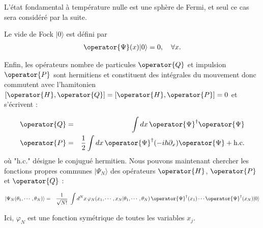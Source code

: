 
L’état fondamental à température nulle est une sphère de Fermi, et seul ce cas sera considéré par la suite.

Le vide de Fock \( |0\rangle \) est défini par %
\begin{eqnarray}
\operator{\Psi}(x) |0\rangle = 0, \quad \forall x. \label{eq:fock_vide}
\end{eqnarray}





Enfin, les opérateurs nombre de particules \( \operator{Q} \) et impulsion \( \operator{P} \) sont hermitiens et constituent des intégrales du mouvement donc commutent avec l'hamitonien $[\operator{H} , \operator{Q} ] = [\operator{H} , \operator{P}]  = 0 $ et s’écrivent :

\begin{eqnarray}
	\operator{Q}  &= & \int dx \, \operator{\Psi}^\dagger \operator{\Psi}  \label{eq:op_nombre} \\
	\operator{P}  &=& \frac{1}{2} \int dx \, \operator{\Psi}^\dagger (-i \hbar \partial_x) \operator{\Psi	} + \text{h.c.}  \label{eq:op_impulsion}
\end{eqnarray}
où "h.c." désigne le conjugué hermitien.
Nous pouvons maintenant chercher les fonctions propres communes \( |\Psi_N\rangle \) des opérateurs \( \operator{H} \), \( \operator{P} \) et \( \operator{Q} \) :

\begin{eqnarray*}
	|\Psi_N ( \theta_1 , \cdots , \theta_N ) \rangle  & = &  \frac{1}{\sqrt{N!}} \int d^N x \, \varphi_N ( x_1 , \cdots , x_N \vert \theta_1 , \cdots , \theta_N ) \, \operator{\Psi}^\dag ( x_1 ) \cdots \operator{\Psi}^\dag ( x_N  ) \vert 0 \rangle \label{eq:etat_bose}		
\end{eqnarray*}

Ici, \( \varphi_N \) est une fonction symétrique de toutes les variables \( x_j \).%

